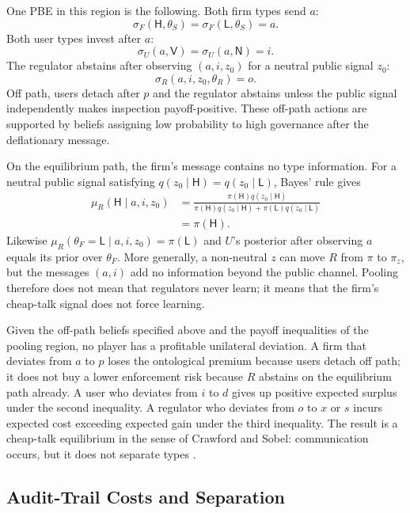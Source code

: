 One PBE in this region is the following. Both firm types send $a$:
\[
\sigma_F(\mathsf{H},\theta_S)=\sigma_F(\mathsf{L},\theta_S)=a .
\]
Both user types invest after $a$:
\[
\sigma_U(a,\mathsf{V})=\sigma_U(a,\mathsf{N})=i .
\]
The regulator abstains after observing $(a,i,z_0)$ for a neutral public signal
$z_0$:
\[
\sigma_R(a,i,z_0,\theta_R)=o .
\]
Off path, users detach after $p$ and the regulator abstains unless the public
signal independently makes inspection payoff-positive. These off-path actions
are supported by beliefs assigning low probability to high governance after the
deflationary message.

On the equilibrium path, the firm's message contains no type information. For a
neutral public signal satisfying
$q(z_0\mid \mathsf{H})=q(z_0\mid \mathsf{L})$, Bayes' rule gives
\[
\begin{aligned}
\mu_R(\mathsf{H}\mid a,i,z_0)
&=
\frac{\pi(\mathsf{H})q(z_0\mid \mathsf{H})}
{\pi(\mathsf{H})q(z_0\mid \mathsf{H})+\pi(\mathsf{L})q(z_0\mid \mathsf{L})}
\\
&=\pi(\mathsf{H}).
\end{aligned}
\]
Likewise $\mu_R(\theta_F=\mathsf{L}\mid a,i,z_0)=\pi(\mathsf{L})$ and
$U$'s posterior after observing $a$ equals its prior over $\theta_F$. More
generally, a non-neutral $z$ can move $R$ from $\pi$ to $\pi_z$, but the
messages $(a,i)$ add no information beyond the public channel. Pooling therefore
does not mean that regulators never learn; it means that the firm's cheap-talk
signal does not force learning.

Given the off-path beliefs specified above and the payoff inequalities of the
pooling region, no player has a profitable unilateral deviation. A firm that deviates from $a$
to $p$ loses the ontological premium because users detach off path; it does not
buy a lower enforcement risk because $R$ abstains on the equilibrium path
already. A user who deviates from $i$ to $d$ gives up positive expected surplus
under the second inequality. A regulator who deviates from $o$ to $x$ or $s$
incurs expected cost exceeding expected gain under the third inequality. The
result is a cheap-talk equilibrium in the sense of Crawford and Sobel:
communication occurs, but it does not separate types \citep{crawford_sobel1982}.

\subsection{Audit-Trail Costs and Separation}
\label{subsec:audit-trail-separation}

